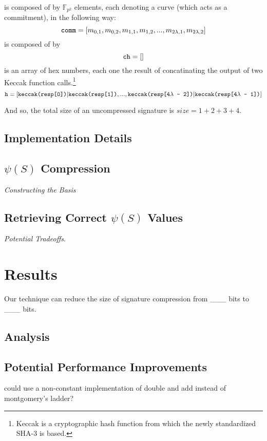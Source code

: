  is composed of by $\mathbb{F}_{p^2}$ elements, each denoting a curve (which acts as a commitment), in the following way:
$$
\texttt{comm} = [m_{0, 1}, m_{0, 2}, m_{1, 1}, m_{1, 2}, ... , m_{2\lambda, 1}, m_{2\lambda, 2}]
$$
 is composed of by
$$
\texttt{ch} = []
$$
 is an array of hex numbers, each one the result of concatinating the output of two Keccak function calls.\footnote{Keccak is a cryptographic hash function from which the newly standardized SHA-3 is based.} 
$$
\texttt{h} = [\texttt{keccak(resp[0])}|\texttt{keccak(resp[1])}, ... , \texttt{keccak(resp[4}\lambda\texttt{ - 2])}|\texttt{keccak(resp[4}\lambda\texttt{ - 1])}]
$$

And so, the total size of an uncompressed signature is $size = 1 + 2 + 3 + 4$.

\subsection{Implementation Details}

\subsection{$\psi(S)$ Compression}

\noindent
\textit{Constructing the Basis}

\subsection{Retrieving Correct $\psi(S)$ Values}

\noindent
\textit{Potential Tradeoffs}.

\section{Results}

Our technique can reduce the size of \sidh signature compression from \_\_\_ bits to \_\_\_ bits.

\subsection{Analysis}

\subsection{Potential Performance Improvements}

could use a non-constant implementation of double and add instead of montgomery's ladder? 

